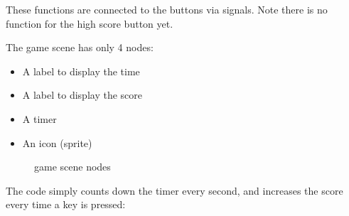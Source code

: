 \documentclass[letterpaper,10pt,english]{sphinxmanual}
\begin{document}
\begin{sphinxVerbatim}[commandchars=\\\{\}]
 

 
\end{sphinxVerbatim}

\sphinxAtStartPar
These functions are connected to the buttons via signals. Note there is
no function for the high score button yet.

\sphinxAtStartPar
The game scene has only 4 nodes:
\begin{itemize}
\item {} 
\sphinxAtStartPar
A label to display the time

\item {} 
\sphinxAtStartPar
A label to display the score

\item {} 
\sphinxAtStartPar
A timer

\item {} 
\sphinxAtStartPar
An icon (sprite)

\end{itemize}

\begin{figure}[htbp]
\centering
\capstart

\noindent{}
\caption{game scene nodes}\label{\detokenize{tutorial:id1}}\end{figure}

\sphinxAtStartPar
The code simply counts down the timer every second, and increases the
score every time a key is pressed:
\end{document}
